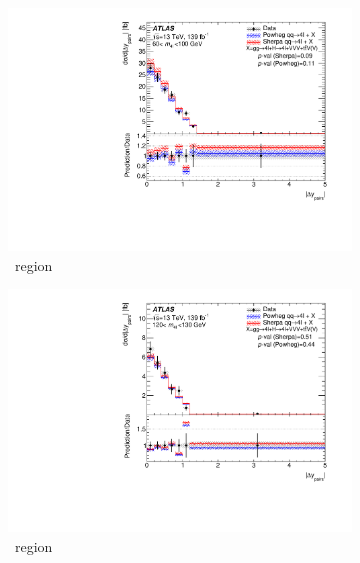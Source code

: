 \begin{figure}[H]
    \begin{subfigure}{.49\textwidth}\centering
      \includegraphics[width=.95\linewidth]{Figures/m4l/UnfoldedResults/linY_Unfolded_Data_deltaYPairs_m4l60-100.pdf}\caption{\ZFourL \ region}\label{fig:sub-first}
    \end{subfigure}
    \begin{subfigure}{.49\textwidth}\centering
      \includegraphics[width=.95\linewidth]{Figures/m4l/UnfoldedResults/linY_Unfolded_Data_deltaYPairs_m4l120-130.pdf} \caption{\HFourL \ region}\label{fig:sub-second}
    \end{subfigure}
    \begin{subfigure}{.49\textwidth}\centering

\end{subfigure}
\end{figure}
